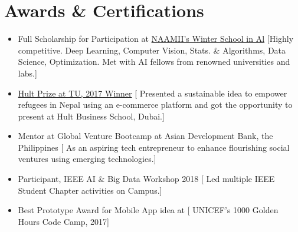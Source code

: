 \documentclass{resume}
\begin{document}
\section{Awards \& Certifications  }
\begin{itemize}
    
\item {Full Scholarship for Participation at \href{https://1nepalschool.naamii.com.np/}{NAAMII's Winter School in Al}}
[Highly competitive. Deep Learning, Computer Vision, Stats. \& Algorithms, Data Science, Optimization. Met with AI fellows from renowned universities and labs.] 


\item {\href{https://glocalkhabar.com/hult-prize-tu-winner-team-aegis-social-entrepreneurship/}{Hult Prize at TU, 2017 Winner}}
[ Presented a sustainable idea to empower refugees in Nepal using an e-commerce platform and got the opportunity to present at Hult Business School, Dubai.]

\item {Mentor at Global Venture Bootcamp at Asian Development Bank, the Philippines}
[ As an aspiring tech entrepreneur to enhance flourishing social ventures using emerging technologies.]

\item {Participant, IEEE AI \& Big Data Workshop 2018}
[ Led multiple IEEE Student Chapter activities on Campus.]

\item{Best Prototype Award for Mobile App idea at }
[ UNICEF's 1000 Golden Hours Code Camp, 2017]
\end{itemize}

\vspace{5mm}
\end{document}
